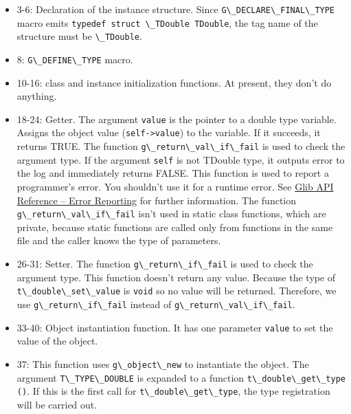 \begin{itemize}
\tightlist
\item
  3-6: Declaration of the instance structure. Since
  \passthrough{\lstinline!G\_DECLARE\_FINAL\_TYPE!} macro emits
  \passthrough{\lstinline!typedef struct \_TDouble TDouble!}, the tag
  name of the structure must be \passthrough{\lstinline!\_TDouble!}.
\item
  8: \passthrough{\lstinline!G\_DEFINE\_TYPE!} macro.
\item
  10-16: class and instance initialization functions. At present, they
  don't do anything.
\item
  18-24: Getter. The argument \passthrough{\lstinline!value!} is the
  pointer to a double type variable. Assigns the object value
  (\passthrough{\lstinline!self->value!}) to the variable. If it
  succeeds, it returns TRUE. The function
  \passthrough{\lstinline!g\_return\_val\_if\_fail!} is used to check
  the argument type. If the argument \passthrough{\lstinline!self!} is
  not TDouble type, it outputs error to the log and immediately returns
  FALSE. This function is used to report a programmer's error. You
  shouldn't use it for a runtime error. See
  \href{https://docs.gtk.org/glib/error-reporting.html}{Glib API
  Reference -- Error Reporting} for further information. The function
  \passthrough{\lstinline!g\_return\_val\_if\_fail!} isn't used in
  static class functions, which are private, because static functions
  are called only from functions in the same file and the caller knows
  the type of parameters.
\item
  26-31: Setter. The function
  \passthrough{\lstinline!g\_return\_if\_fail!} is used to check the
  argument type. This function doesn't return any value. Because the
  type of \passthrough{\lstinline!t\_double\_set\_value!} is
  \passthrough{\lstinline!void!} so no value will be returned.
  Therefore, we use \passthrough{\lstinline!g\_return\_if\_fail!}
  instead of \passthrough{\lstinline!g\_return\_val\_if\_fail!}.
\item
  33-40: Object instantiation function. It has one parameter
  \passthrough{\lstinline!value!} to set the value of the object.
\item
  37: This function uses \passthrough{\lstinline!g\_object\_new!} to
  instantiate the object. The argument
  \passthrough{\lstinline!T\_TYPE\_DOUBLE!} is expanded to a function
  \passthrough{\lstinline!t\_double\_get\_type ()!}. If this is the
  first call for \passthrough{\lstinline!t\_double\_get\_type!}, the
  type registration will be carried out.
\end{itemize}

